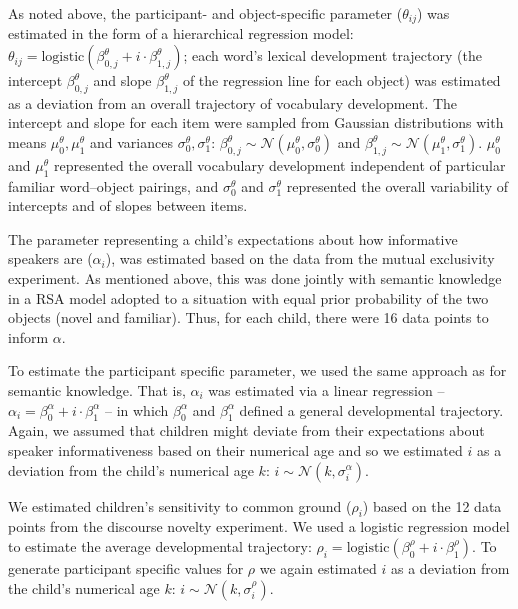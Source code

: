 \documentclass[
  man,floatsintext]{apa6}
\begin{document}
As noted above, the participant- and object-specific parameter (\(\theta_{ij}\)) was estimated in the form of a hierarchical regression model: \(\theta_{ij} = \text{logistic}(\beta^{\theta}_{0, j} + i \cdot \beta^{\theta}_{1, j})\); each word's lexical development trajectory (the intercept \(\beta^{\theta}_{0, j}\) and slope \(\beta^{\theta}_{1, j}\) of the regression line for each object) was estimated as a deviation from an overall trajectory of vocabulary development. The intercept and slope for each item were sampled from Gaussian distributions with means \(\mu^\theta_0, \mu^\theta_1\) and variances \(\sigma^\theta_0, \sigma^\theta_1\): \(\beta^{\theta}_{0, j} \sim \mathcal{N}(\mu^\theta_0, \sigma^\theta_0)\) and \(\beta^{\theta}_{1, j} \sim \mathcal{N}(\mu^\theta_1, \sigma^\theta_1)\). \(\mu^\theta_0\) and \(\mu^\theta_1\) represented the overall vocabulary development independent of particular familiar word--object pairings, and \(\sigma^\theta_0\) and \(\sigma^\theta_1\) represented the overall variability of intercepts and of slopes between items.

The parameter representing a child's expectations about how informative speakers are (\(\alpha_i\)), was estimated based on the data from the mutual exclusivity experiment. As mentioned above, this was done jointly with semantic knowledge in a RSA model adopted to a situation with equal prior probability of the two objects (novel and familiar). Thus, for each child, there were 16 data points to inform \(\alpha\).

To estimate the participant specific parameter, we used the same approach as for semantic knowledge. That is, \(\alpha_i\) was estimated via a linear regression -- \(\alpha_i = \beta^\alpha_0 + i \cdot \beta^\alpha_1\) -- in which \(\beta^\alpha_0\) and \(\beta^\alpha_1\) defined a general developmental trajectory. Again, we assumed that children might deviate from their expectations about speaker informativeness based on their numerical age and so we estimated \(i\) as a deviation from the child's numerical age \(k\): \(i \sim \mathcal{N}(k, \sigma^\alpha_i)\).

We estimated children's sensitivity to common ground (\(\rho_i\)) based on the 12 data points from the discourse novelty experiment. We used a logistic regression model to estimate the average developmental trajectory: \(\rho_i = \text{logistic}(\beta^\rho_0 + i \cdot \beta^\rho_1)\). To generate participant specific values for \(\rho\) we again estimated \(i\) as a deviation from the child's numerical age \(k\): \(i \sim \mathcal{N}(k, \sigma^\rho_i)\).
\end{document}
